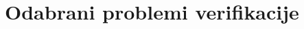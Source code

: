 \documentclass[11pt]{beamer}
\theoremstyle{definition}
\begin{document}
{


\section{Odabrani problemi verifikacije}
\label{sec:naslovN}

}
\end{document}
